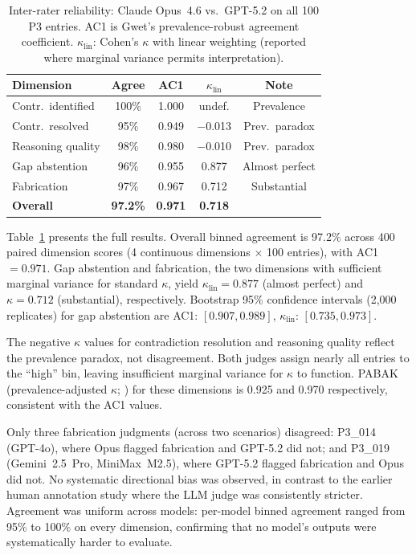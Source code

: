 \documentclass[11pt,a4paper]{article}
\begin{document}
\begin{table}[tbp]
\centering
\caption{Inter-rater reliability: Claude Opus~4.6 vs.\ GPT-5.2 on all 100 P3 entries. AC1 is Gwet's prevalence-robust agreement coefficient. $\kappa_{\mathrm{lin}}$: Cohen's $\kappa$ with linear weighting (reported where marginal variance permits interpretation).}
\label{tab:kappa}
\small
\begin{tabular}{lcccc}
\toprule
\textbf{Dimension} & \textbf{Agree} & \textbf{AC1} & \textbf{$\kappa_{\mathrm{lin}}$} & \textbf{Note} \\
\midrule
Contr.\ identified & 100\% & 1.000 & undef.    & Prevalence \\
Contr.\ resolved   &  95\% & 0.949 & $-$0.013  & Prev.\ paradox \\
Reasoning quality  &  98\% & 0.980 & $-$0.010  & Prev.\ paradox \\
Gap abstention     &  96\% & 0.955 & 0.877     & Almost perfect \\
Fabrication        &  97\% & 0.967 & 0.712     & Substantial \\
\midrule
\textbf{Overall}   &  \textbf{97.2\%} & \textbf{0.971} & \textbf{0.718} & \\
\bottomrule
\end{tabular}
\end{table}

Table~\ref{tab:kappa} presents the full results. Overall binned agreement is 97.2\% across 400 paired dimension scores (4 continuous dimensions $\times$ 100 entries), with AC1 $= 0.971$. Gap abstention and fabrication, the two dimensions with sufficient marginal variance for standard $\kappa$, yield $\kappa_{\mathrm{lin}} = 0.877$ (almost perfect) and $\kappa = 0.712$ (substantial), respectively. Bootstrap 95\% confidence intervals (2{,}000 replicates) for gap abstention are AC1: $[0.907, 0.989]$, $\kappa_{\mathrm{lin}}$: $[0.735, 0.973]$.

The negative $\kappa$ values for contradiction resolution and reasoning quality reflect the prevalence paradox, not disagreement. Both judges assign nearly all entries to the ``high'' bin, leaving insufficient marginal variance for $\kappa$ to function. PABAK (prevalence-adjusted $\kappa$; \citealt{byrt1993bias}) for these dimensions is 0.925 and 0.970 respectively, consistent with the AC1 values.

Only three fabrication judgments (across two scenarios) disagreed: P3\_014 (GPT-4o), where Opus flagged fabrication and GPT-5.2 did not; and P3\_019 (Gemini~2.5~Pro, MiniMax~M2.5), where GPT-5.2 flagged fabrication and Opus did not. No systematic directional bias was observed, in contrast to the earlier human annotation study where the LLM judge was consistently stricter. Agreement was uniform across models: per-model binned agreement ranged from 95\% to 100\% on every dimension, confirming that no model's outputs were systematically harder to evaluate.
\end{document}
